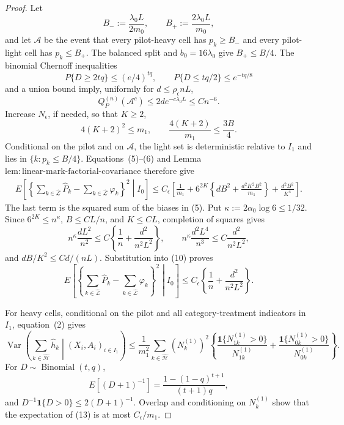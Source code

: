 \documentclass{article}
\begin{document}
\begin{proof}
Let
\[
 B_-:=\frac{\lambda_0L}{2m_0},\qquad
 B_+:=\frac{2\lambda_0L}{m_0},
\]
and let \(\mathcal A\) be the event that every pilot-heavy cell has \(p_k\ge B_-\) and every pilot-light cell has \(p_k\le B_+\).  The balanced split and \(b_0=16\lambda_0\) give \(B_+\le B/4\).  The binomial Chernoff inequalities
\[
 P\{D\ge2tq\}\le(e/4)^{tq},\qquad
 P\{D\le tq/2\}\le e^{-tq/8}
\tag{7}
\]
and a union bound imply, uniformly for \(d\le\rho_{\epsilon}nL\),
\[
 Q_P^{(n)}(\mathcal A^c)\le2d e^{-c\lambda_0L}\le Cn^{-6}.
\tag{8}
\]
Increase \(N_{\epsilon}\), if needed, so that \(K\ge2\),
\[
 4(K+2)^2\le m_1,\qquad
 \frac{4(K+2)}{m_1}\le\frac{3B}{4}.
\tag{9}
\]
Conditional on the pilot and on \(\mathcal A\), the light set is deterministic relative to \(I_1\) and lies in \(\{k:p_k\le B/4\}\).  Equations~(5)--(6) and Lemma~\(\mathrm{lem:linear\text{-}mark\text{-}factorial\text{-}covariance}\) therefore give
\[
\begin{aligned}
 E\!\left[\left\{\sum_{k\in\widehat{\mathcal L}}\widehat P_k
 -\sum_{k\in\widehat{\mathcal L}}\varphi_k\right\}^2\middle|I_0\right]
 \le C_{\epsilon}\left[
 \frac1{m_1}+6^{2K}\left\{dB^2+\frac{d^2K^2B^2}{m_1}\right\}
 +\frac{d^2B^2}{K^4}\right].
\end{aligned}
\tag{10}
\]
The last term is the squared sum of the biases in (5).  Put \(\kappa:=2\alpha_0\log6\le1/32\).  Since \(6^{2K}\le n^{\kappa}\), \(B\le CL/n\), and \(K\le CL\), completion of squares gives
\[
 n^{\kappa}\frac{dL^2}{n^2}
 \le C\left\{\frac1n+\frac{d^2}{n^2L^2}\right\},
 \qquad
 n^{\kappa}\frac{d^2L^4}{n^3}
 \le C\frac{d^2}{n^2L^2},
\tag{11}
\]
and \(dB/K^2\le Cd/(nL)\).  Substitution into (10) proves
\[
 E\!\left[\left\{\sum_{k\in\widehat{\mathcal L}}\widehat P_k
 -\sum_{k\in\widehat{\mathcal L}}\varphi_k\right\}^2\middle|I_0\right]
 \le C_{\epsilon}\left\{\frac1n+\frac{d^2}{n^2L^2}\right\}.
\tag{12}
\]

For heavy cells, conditional on the pilot and all category-treatment indicators in \(I_1\), equation~(2) gives
\[
 \operatorname{Var}\!\left(\sum_{k\in\widehat{\mathcal H}}\widehat h_k
 \middle|(X_i,A_i)_{i\in I_1}\right)
 \le\frac1{m_1^2}\sum_{k\in\widehat{\mathcal H}}(N_k^{(1)})^2
 \left\{\frac{\mathbf1\{N_{1k}^{(1)}>0\}}{N_{1k}^{(1)}}+
 \frac{\mathbf1\{N_{0k}^{(1)}>0\}}{N_{0k}^{(1)}}\right\}.
\tag{13}
\]
For \(D\sim\operatorname{Binomial}(t,q)\),
\[
 E[(D+1)^{-1}]=\frac{1-(1-q)^{t+1}}{(t+1)q},
\tag{14}
\]
and \(D^{-1}\mathbf1\{D>0\}\le2(D+1)^{-1}\).  Overlap and conditioning on \(N_k^{(1)}\) show that the expectation of (13) is at most \(C_{\epsilon}/m_1\).


\end{proof}
\end{document}
